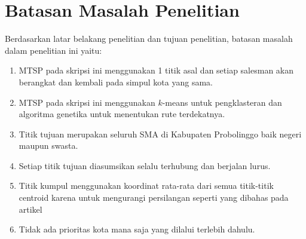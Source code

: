 \section{Batasan Masalah Penelitian}

Berdasarkan latar belakang penelitian dan tujuan penelitian, batasan masalah dalam penelitian ini yaitu:

\begin{enumerate}
	\item MTSP pada skripsi ini menggunakan 1 titik asal dan setiap salesman akan berangkat dan kembali pada simpul kota yang sama.
	\item MTSP pada skripsi ini menggunakan $k$-means untuk pengklasteran dan algoritma genetika untuk menentukan rute terdekatnya.
	\item Titik tujuan merupakan seluruh SMA di Kabupaten Probolinggo baik negeri maupun swasta.
	\item Setiap titik tujuan diasumsikan selalu terhubung dan berjalan lurus.
	\item Titik kumpul menggunakan koordinat rata-rata dari semua titik-titik centroid karena untuk mengurangi persilangan seperti yang dibahas pada artikel \cite{inproceedings}
	\item Tidak ada prioritas kota mana saja yang dilalui terlebih dahulu.
\end{enumerate}